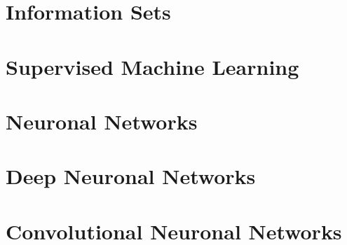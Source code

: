 \documentclass[a4paper]{article}
\begin{document}
		
	
	\section{Information Sets}
	
	
	
	\section{Supervised Machine Learning}
	
	
	
	\section{Neuronal Networks}
	
	
	
	\section{Deep Neuronal Networks}
	
	
	
	\section{Convolutional Neuronal Networks}
	
	
\end{document}
